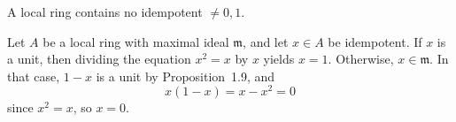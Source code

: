 \begin{exercise}
A local ring contains no idempotent \(\neq 0, 1\).
\end{exercise}

\begin{solution}
Let \(A\) be a local ring with maximal ideal \(\mathfrak{m}\), and let \(x \in A\) be idempotent.
If \(x\) is a unit, then dividing the equation \(x^2 = x\) by \(x\) yields \(x = 1\).
Otherwise, \(x \in \mathfrak{m}\).
In that case, \(1 - x\) is a unit by Proposition~1.9, and
\begin{equation*}
x (1 - x) = x - x^2 = 0
\end{equation*}
since \(x^2 = x\), so \(x = 0\).
\end{solution}